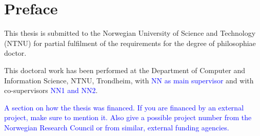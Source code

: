 \section*{Preface}

This thesis is submitted to the Norwegian University of Science and Technology (NTNU) for partial fulfilment of the 
requirements for the degree of philosophiae doctor.

This doctoral work has been performed at the Department of Computer and Information Science, NTNU, Trondheim, with 
\textcolor{blue}{NN as main supervisor} and with co-supervisors \textcolor{blue}{NN1 and NN2}.

\textcolor{blue}{A section on how the thesis was financed. If you are financed by an external project, make sure to 
mention it. Also give a possible project number from the Norwegian Research Council or from similar, external funding 
agencies.}


\cleardoublepage